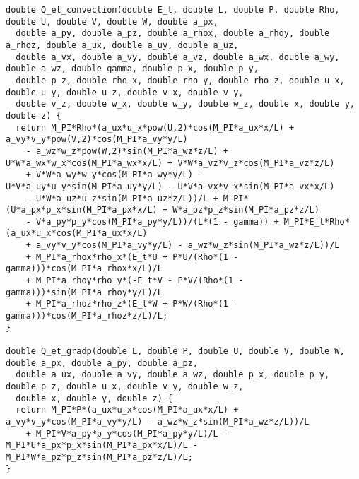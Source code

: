 \documentclass[10pt]{article}
\begin{document}
\begin{footnotesize}
\begin{verbatim}
double Q_et_convection(double E_t, double L, double P, double Rho, double U, double V, double W, double a_px, 
  double a_py, double a_pz, double a_rhox, double a_rhoy, double a_rhoz, double a_ux, double a_uy, double a_uz, 
  double a_vx, double a_vy, double a_vz, double a_wx, double a_wy, double a_wz, double gamma, double p_x, double p_y, 
  double p_z, double rho_x, double rho_y, double rho_z, double u_x, double u_y, double u_z, double v_x, double v_y, 
  double v_z, double w_x, double w_y, double w_z, double x, double y, double z) {
  return M_PI*Rho*(a_ux*u_x*pow(U,2)*cos(M_PI*a_ux*x/L) + a_vy*v_y*pow(V,2)*cos(M_PI*a_vy*y/L) 
	- a_wz*w_z*pow(W,2)*sin(M_PI*a_wz*z/L) + U*W*a_wx*w_x*cos(M_PI*a_wx*x/L) + V*W*a_vz*v_z*cos(M_PI*a_vz*z/L) 
	+ V*W*a_wy*w_y*cos(M_PI*a_wy*y/L) - U*V*a_uy*u_y*sin(M_PI*a_uy*y/L) - U*V*a_vx*v_x*sin(M_PI*a_vx*x/L) 
	- U*W*a_uz*u_z*sin(M_PI*a_uz*z/L))/L + M_PI*(U*a_px*p_x*sin(M_PI*a_px*x/L) + W*a_pz*p_z*sin(M_PI*a_pz*z/L) 
	- V*a_py*p_y*cos(M_PI*a_py*y/L))/(L*(1 - gamma)) + M_PI*E_t*Rho*(a_ux*u_x*cos(M_PI*a_ux*x/L) 
	+ a_vy*v_y*cos(M_PI*a_vy*y/L) - a_wz*w_z*sin(M_PI*a_wz*z/L))/L 
	+ M_PI*a_rhox*rho_x*(E_t*U + P*U/(Rho*(1 - gamma)))*cos(M_PI*a_rhox*x/L)/L 
	+ M_PI*a_rhoy*rho_y*(-E_t*V - P*V/(Rho*(1 - gamma)))*sin(M_PI*a_rhoy*y/L)/L 
	+ M_PI*a_rhoz*rho_z*(E_t*W + P*W/(Rho*(1 - gamma)))*cos(M_PI*a_rhoz*z/L)/L;
}

double Q_et_gradp(double L, double P, double U, double V, double W, double a_px, double a_py, double a_pz, 
  double a_ux, double a_vy, double a_wz, double p_x, double p_y, double p_z, double u_x, double v_y, double w_z, 
  double x, double y, double z) {
  return M_PI*P*(a_ux*u_x*cos(M_PI*a_ux*x/L) + a_vy*v_y*cos(M_PI*a_vy*y/L) - a_wz*w_z*sin(M_PI*a_wz*z/L))/L 
	+ M_PI*V*a_py*p_y*cos(M_PI*a_py*y/L)/L - M_PI*U*a_px*p_x*sin(M_PI*a_px*x/L)/L - M_PI*W*a_pz*p_z*sin(M_PI*a_pz*z/L)/L;
}


\end{verbatim}
\end{footnotesize}
\end{document}
